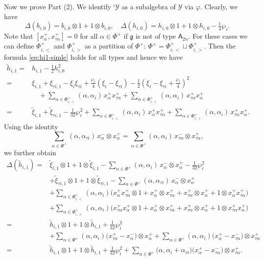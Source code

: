 \documentclass[11pt,reqno]{amsart}
\numberwithin{equation}{section}
\theoremstyle{definition}
\theoremstyle{remark}
\newcommand{\g}{\mathfrak{g}}
\newcommand{\tl}{\tilde}
\newcommand{\Y}{{\mathscr{Y}}}
\newcommand{\Yi}{{^\imath\mathscr{Y}}}
\begin{document}
Now we prove Part (2). We identify $\Yi$ as a subalgebra of $\Y$ via $\varphi$. Clearly, we have 
\[
\Delta(b_{i,0})=b_{i,0}\otimes 1+1\otimes b_{i,0},\quad 
\Delta(h_{i,0})=h_{i,0}\otimes 1+1\otimes h_{i,0}-\tfrac14\wp_i.
\]
Note that $[x_{\alpha}^+,x_{\tau \alpha}^+]=0$ for all $\alpha\in\Phi^+$ if $\g$ is not of type $\mathsf A_{2n}$. For these cases we can define $\Phi^+_{i,<}$ and $\Phi^+_{i,>}$ as a partition of $\Phi^+$: $\Phi^+=\Phi^+_{i,<}\sqcup \Phi^+_{i,>}$. Then the formula \eqref{eq:hi1-simle} holds for all types  and hence we have
\begin{align*}
\tl h_{i,1}
={}& h_{i,1}-\tfrac12 h_{i,0}^{2}
\\
={}&
\xi_{i,1}+\xi_{\tau i,1}-\xi_i\xi_{\tau i}
+\tfrac{\wp_i}{4}(\xi_i-\xi_{\tau i})
-\tfrac12
\left(
\xi_i-\xi_{\tau i}+\tfrac{\wp_i}{4}
\right)^2
\\
&\quad
+\sum_{\alpha\in \Phi^+_{i,<}}
(\alpha,\alpha_i)\,
 x_\alpha^+ x_{\tau\alpha}^+
+\sum_{\alpha\in \Phi^+_{i,>}}
(\alpha,\alpha_i)\,
 x_{\tau\alpha}^+ x_\alpha^+
\\
={}&
\tl\xi_{i,1}
+\tl\xi_{\tau i,1}
-\tfrac{1}{32}\wp_i^2
+\sum_{\alpha\in \Phi^+_{i,<}}
(\alpha,\alpha_i)\,
 x_\alpha^+ x_{\tau\alpha}^+
+\sum_{\alpha\in \Phi^+_{i,>}}
(\alpha,\alpha_i)\,
 x_{\tau\alpha}^+ x_\alpha^+.
\end{align*}
Using the identity
\[
\sum_{\alpha\in \Phi^+}
(\alpha,\alpha_{\tau i})\,
 x_\alpha^-\otimes x_\alpha^+=\sum_{\alpha\in \Phi^+}
(\alpha,\alpha_{i})\,
 x_{\tau \alpha}^-\otimes x_{\tau\alpha}^+,
\]
we further obtain
\begin{align*}
\Delta(\tl h_{i,1})
={}&
\tl\xi_{i,1}\otimes 1
+1\otimes\tl\xi_{i,1}
-\sum_{\alpha\in \Phi^+}
(\alpha,\alpha_i)\,
 x_\alpha^-\otimes x_\alpha^+
-\tfrac{1}{32}\wp_i^2
\\
&
+\tl\xi_{\tau i,1}\otimes 1
+1\otimes\tl \xi_{\tau i,1}
-\sum_{\alpha\in \Phi^+}
(\alpha,\alpha_{\tau i})\,
 x_\alpha^-\otimes x_\alpha^+
\\
&
+\sum_{\alpha\in \Phi^+_{i,<}}
(\alpha,\alpha_i)
\bigl(
   x_\alpha^+ x_{\tau\alpha}^+\otimes 1
 + x_\alpha^+\otimes x_{\tau\alpha}^+
 + x_{\tau\alpha}^+\otimes x_\alpha^+
 +1\otimes x_\alpha^+ x_{\tau\alpha}^+
\bigr)
\\
&
+\sum_{\alpha\in \Phi^+_{i,>}}
(\alpha,\alpha_i)
\bigl(
   x_{\tau\alpha}^+ x_\alpha^+\otimes 1
 + x_\alpha^+\otimes x_{\tau\alpha}^+
 + x_{\tau\alpha}^+\otimes x_\alpha^+
 +1\otimes x_{\tau\alpha}^+ x_\alpha^+
\bigr)
\\
={}&
\tl h_{i,1}\otimes 1
+1\otimes\tl h_{i,1}
+\tfrac{1}{32}\wp_i^2
\\
&+\sum_{\alpha\in \Phi^+}
(\alpha,\alpha_i)
\bigl(
 x_{\tau\alpha}^+- x_\alpha^-
\bigr)
\otimes x_\alpha^+
+\sum_{\alpha\in \Phi^+}
(\alpha,\alpha_{i})
\bigl(
 x_\alpha^+- x_{\tau\alpha}^-
\bigr)
\otimes x_{\tau\alpha}^+
\\
={}&
\tl h_{i,1}\otimes 1
+1\otimes\tl h_{i,1}+\tfrac{1}{32}\wp_i^2
+\sum_{\alpha\in \Phi^+}
\bigl(\alpha,\alpha_i+\alpha_{\tau i}\bigr)
\bigl(
 x_\alpha^+- x_{\tau\alpha}^-
\bigr)
\otimes x_{\tau\alpha}^+ .
\end{align*}
\end{document}

